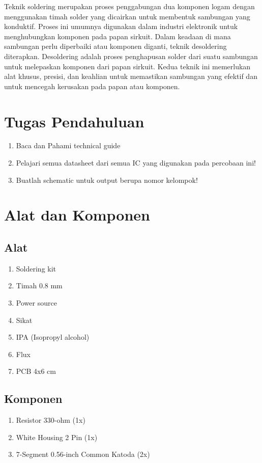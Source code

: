 Teknik soldering merupakan proses penggabungan dua komponen logam dengan menggunakan timah solder yang dicairkan untuk membentuk sambungan yang konduktif. 
Proses ini umumnya digunakan dalam industri elektronik untuk menghubungkan komponen pada papan sirkuit. Dalam keadaan di mana sambungan perlu diperbaiki 
atau komponen diganti, teknik desoldering diterapkan. Desoldering adalah proses penghapusan solder dari suatu sambungan untuk melepaskan komponen dari papan sirkuit. 
Kedua teknik ini memerlukan alat khusus, presisi, dan keahlian untuk memastikan sambungan yang efektif dan untuk mencegah kerusakan pada papan atau komponen.


\section{Tugas Pendahuluan}
\begin{enumerate}
    \item Baca dan Pahami technical guide
    \item Pelajari semua datasheet dari semua IC yang digunakan pada percobaan ini!
    \item Buatlah schematic untuk output berupa nomor kelompok!
\end{enumerate}

\section{Alat dan Komponen}
\subsection{Alat}
\begin{enumerate}
    \item Soldering kit
    \item Timah 0.8 mm
    \item Power source
    \item Sikat 
    \item IPA (Isopropyl alcohol)
    \item Flux
    \item PCB 4x6 cm	
\end{enumerate}

\subsection{Komponen}
\begin{enumerate}
    \item Resistor 330-ohm 			        (1x)
    \item White Housing 2 Pin			    (1x)
    \item 7-Segment 0.56-inch Common Katoda	(2x)    
\end{enumerate}
